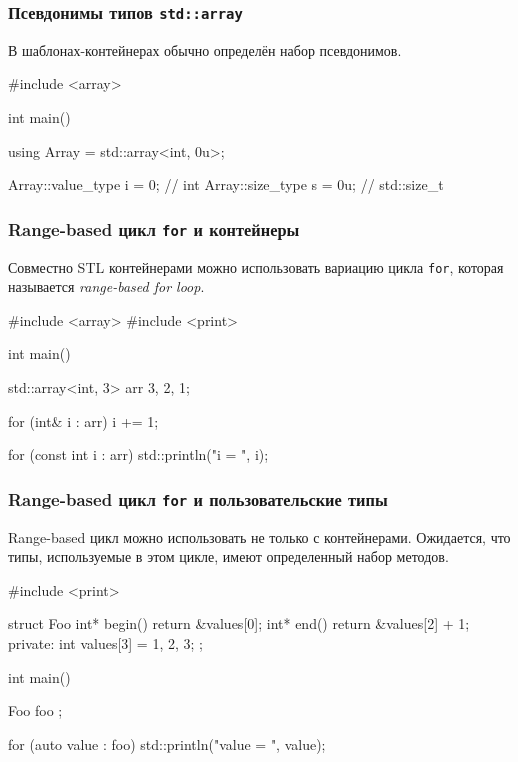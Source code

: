 \documentclass[compress, 8pt, aspectratio=169]{beamer}
\begin{document}
  \begin{frame}[fragile]

    \frametitle{Псевдонимы типов \texttt{std::array}}

    В шаблонах-контейнерах обычно определён набор псевдонимов.

    \begin{mycppinplacelisting}
#include <array>

int main() {
    using Array = std::array<int, 0u>;

    Array::value_type i = 0; // int
    Array::size_type s = 0u; // std::size_t
}
    \end{mycppinplacelisting}

  \end{frame}

  \begin{frame}[fragile]

    \frametitle{Range-based цикл \texttt{for} и контейнеры}

    Совместно STL контейнерами можно использовать вариацию цикла \texttt{for},
    которая называется \textit{range-based for loop}\footnotemark{}.


    \begin{myinplacelisting}[minted language=cpp]
#include <array>
#include <print>

int main() {
    std::array<int, 3> arr {3, 2, 1};

    for (int& i : arr) {
        i += 1;
    }

    for (const int i : arr) {
        std::println("i = {}", i);
    }
}
    \end{myinplacelisting}

  \end{frame}

  \begin{frame}[fragile]

    \frametitle{Range-based цикл \texttt{for} и пользовательские типы}

    Range-based цикл можно использовать не только с контейнерами.
    Ожидается, что типы, используемые в этом цикле, имеют определенный
    набор методов.

    \begin{mycppinplacelisting}
#include <print>

struct Foo {
    int* begin() { return &values[0]; }
    int* end() { return &values[2] + 1; }
private:
    int values[3] = {1, 2, 3};
};

int main() {
    Foo foo {};

    for (auto value : foo) {
        std::println("value = {}", value);
    }
}
    \end{mycppinplacelisting}

  \end{frame}
\end{document}
